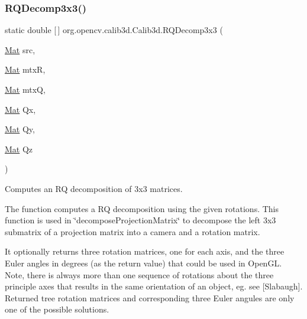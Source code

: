 \subsubsection{\texorpdfstring{R\+Q\+Decomp3x3()}{RQDecomp3x3()}\hspace{0.1cm}{\footnotesize\ttfamily [1/2]}}
{\footnotesize\ttfamily static double \mbox{[}$\,$\mbox{]} org.\+opencv.\+calib3d.\+Calib3d.\+R\+Q\+Decomp3x3 (\begin{DoxyParamCaption}\item[{\mbox{\hyperlink{classorg_1_1opencv_1_1core_1_1_mat}{Mat}}}]{src,  }\item[{\mbox{\hyperlink{classorg_1_1opencv_1_1core_1_1_mat}{Mat}}}]{mtxR,  }\item[{\mbox{\hyperlink{classorg_1_1opencv_1_1core_1_1_mat}{Mat}}}]{mtxQ,  }\item[{\mbox{\hyperlink{classorg_1_1opencv_1_1core_1_1_mat}{Mat}}}]{Qx,  }\item[{\mbox{\hyperlink{classorg_1_1opencv_1_1core_1_1_mat}{Mat}}}]{Qy,  }\item[{\mbox{\hyperlink{classorg_1_1opencv_1_1core_1_1_mat}{Mat}}}]{Qz }\end{DoxyParamCaption})\hspace{0.3cm}{\ttfamily [static]}}

Computes an RQ decomposition of 3x3 matrices.

The function computes a RQ decomposition using the given rotations. This function is used in \char`\"{}decompose\+Projection\+Matrix\char`\"{} to decompose the left 3x3 submatrix of a projection matrix into a camera and a rotation matrix.

It optionally returns three rotation matrices, one for each axis, and the three Euler angles in degrees (as the return value) that could be used in Open\+GL. Note, there is always more than one sequence of rotations about the three principle axes that results in the same orientation of an object, eg. see \mbox{[}Slabaugh\mbox{]}. Returned tree rotation matrices and corresponding three Euler angules are only one of the possible solutions.


